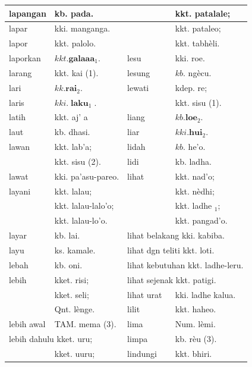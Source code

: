 \documentclass[10pt]{article}
\begin{document}
\begin{center}
\begin{tabular}{|l|l|l|l|}
\hline
lapangan & kb. pada. &  & kkt. patalale; \\
\hline
lapar & kki. manganga. &  & kkt. pataleo; \\
\hline
lapor & kkt. palolo. &  & kkt. tabhèli. \\
\hline
laporkan & \(k k t . \mathbf{g a l a a} \mathbf{a}_{1}\). & lesu & kki. roe. \\
\hline
larang & kkt. kai (1). & lesung & \(k b\). ngècu. \\
\hline
lari & \(k k . \mathbf{r a i}_{2}\). & lewati & kdep. re; \\
\hline
laris & \(k k i . \boldsymbol{\operatorname { l a k u }}_{1}\). &  & kkt. sisu (1). \\
\hline
latih & kkt. aj' a & liang & \(k b . \mathbf{l o e}_{2}\). \\
\hline
laut & kb. dhasi. & liar & \(k k i . \mathbf{h u i}_{2}\). \\
\hline
lawan & kkt. lab'a; & lidah & \(k b\). he'o. \\
\hline
 & kkt. sisu (2). & lidi & kb. ladha. \\
\hline
lawat & kki. pa'asu-pareo. & lihat & kkt. nad'o; \\
\hline
layani & kkt. lalau; &  & kkt. nèdhi; \\
\hline
 & kkt. lalau-lalo'o; &  & kkt. ladhe \({ }_{1}\); \\
\hline
 & kkt. lalau-lo'o. &  & kkt. pangad'o. \\
\hline
layar & kb. lai. & \multicolumn{2}{|l|}{lihat belakang kki. kabiba.} \\
\hline
layu & ks. kamale. & \multicolumn{2}{|l|}{lihat dgn teliti kkt. loti.} \\
\hline
lebah & kb. oni. & \multicolumn{2}{|c|}{lihat kebutuhan kkt. ladhe-leru.} \\
\hline
lebih & kket. risi; & \multicolumn{2}{|l|}{lihat sejenak kkt. patigi.} \\
\hline
 & kket. seli; & lihat urat & kki. ladhe kalua. \\
\hline
 & Qnt. lènge. & lilit & kkt. haheo. \\
\hline
lebih awal & TAM. mema (3). & lima & Num. lèmi. \\
\hline
\multicolumn{2}{|l|}{lebih dahulu kket. uru;} & limpa & kb. rèu (3). \\
\hline
 & kket. uuru; & lindungi & kkt. bhiri. \\

\end{tabular}
\end{center}
\end{document}
